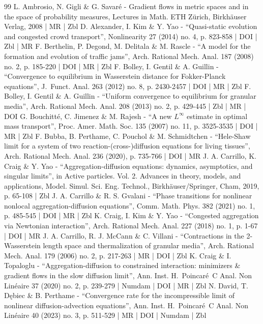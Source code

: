 \documentclass[10pt]{amsart}
\theoremstyle{plain}
\theoremstyle{remark}
\begin{document}
\begin{thebibliography}{99}
L. Ambrosio, N. Gigli \& G. Savaré - Gradient flows in metric spaces and in the space of probability measures, Lectures in Math. ETH Zürich, Birkhäuser Verlag, 2008 | MR | Zbl
D. Alexander, I. Kim \& Y. Yao - “Quasi-static evolution and congested crowd transport”, Nonlinearity 27 (2014) no. 4, p. 823-858 | DOI | Zbl | MR
F. Berthelin, P. Degond, M. Delitala \& M. Rascle - “A model for the formation and evolution of traffic jams”, Arch. Rational Mech. Anal. 187 (2008) no. 2, p. 185-220 | DOI | MR | Zbl
F. Bolley, I. Gentil \& A. Guillin - “Convergence to equilibrium in Wasserstein distance for Fokker-Planck equations”, J. Funct. Anal. 263 (2012) no. 8, p. 2430-2457 | DOI | MR | Zbl
F. Bolley, I. Gentil \& A. Guillin - “Uniform convergence to equilibrium for granular media”, Arch. Rational Mech. Anal. 208 (2013) no. 2, p. 429-445 | Zbl | MR | DOI
G. Bouchitté, C. Jimenez \& M. Rajesh - “A new $L^\infty $ estimate in optimal mass transport”, Proc. Amer. Math. Soc. 135 (2007) no. 11, p. 3525-3535 | DOI | MR | Zbl
F. Bubba, B. Perthame, C. Pouchol \& M. Schmidtchen - “Hele-Shaw limit for a system of two reaction-(cross-)diffusion equations for living tissues”, Arch. Rational Mech. Anal. 236 (2020), p. 735-766 | DOI | MR
J. A. Carrillo, K. Craig \& Y. Yao - “Aggregation-diffusion equations: dynamics, asymptotics, and singular limits”, in Active particles. Vol. 2. Advances in theory, models, and applications, Model. Simul. Sci. Eng. Technol., Birkhäuser/Springer, Cham, 2019, p. 65-108 | Zbl
J. A. Carrillo \& R. S. Gvalani - “Phase transitions for nonlinear nonlocal aggregation-diffusion equations”, Comm. Math. Phys. 382 (2021) no. 1, p. 485-545 | DOI | MR | Zbl
K. Craig, I. Kim \& Y. Yao - “Congested aggregation via Newtonian interaction”, Arch. Rational Mech. Anal. 227 (2018) no. 1, p. 1-67 | DOI | MR
J. A. Carrillo, R. J. McCann \& C. Villani - “Contractions in the 2-Wasserstein length space and thermalization of granular media”, Arch. Rational Mech. Anal. 179 (2006) no. 2, p. 217-263 | MR | DOI | Zbl
K. Craig \& I. Topaloglu - “Aggregation-diffusion to constrained interaction: minimizers \& gradient flows in the slow diffusion limit”, Ann. Inst. H. Poincaré C Anal. Non Linéaire 37 (2020) no. 2, p. 239-279 | Numdam | DOI | MR | Zbl
N. David, T. Dębiec \& B. Perthame - “Convergence rate for the incompressible limit of nonlinear diffusion-advection equations”, Ann. Inst. H. Poincaré C Anal. Non Linéaire 40 (2023) no. 3, p. 511-529 | MR | DOI | Numdam | Zbl

\end{thebibliography}
\end{document}
